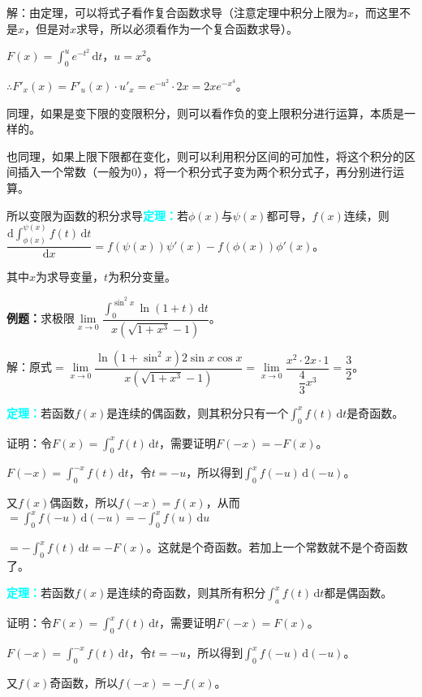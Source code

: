 \documentclass[UTF8, 12pt]{ctexart}
\begin{document}
        解：由定理，可以将式子看作复合函数求导（注意定理中积分上限为$x$，而这里不是$x$，但是对$x$求导，所以必须看作为一个复合函数求导）。

        $F(x)=\int_0^ue^{-t^2}\,\textrm{d}t$，$u=x^2$。

        $\therefore F'_x(x)=F'_u(x)\cdot u'_x=e^{-u^2}\cdot 2x=2xe^{-x^4}$。

        同理，如果是变下限的变限积分，则可以看作负的变上限积分进行运算，本质是一样的。

        也同理，如果上限下限都在变化，则可以利用积分区间的可加性，将这个积分的区间插入一个常数（一般为0），将一个积分式子变为两个积分式子，再分别进行运算。

        所以变限为函数的积分求导\textcolor{aqua}{\textbf{定理：}}若$\phi(x)$与$\psi(x)$都可导，$f(x)$连续，则$\dfrac{\textrm{d}\int_{\phi(x)}^{\psi(x)}f(t)\,\textrm{d}t}{\textrm{d}x}=f(\psi(x))\psi'(x)-f(\phi(x))\phi'(x)$。

        其中$x$为求导变量，$t$为积分变量。

        \textbf{例题：}求极限$\lim\limits_{x\to 0}\dfrac{\int_0^{\sin^2x}\ln(1+t)\,\textrm{d}t}{x(\sqrt{1+x^3}-1)}$。

        解：原式$=\lim\limits_{x\to 0}\dfrac{\ln(1+\sin^2x)2\sin x\cos x}{x(\sqrt{1+x^3}-1)}=\lim\limits_{x\to 0}\dfrac{x^2\cdot 2x\cdot 1}{\dfrac{4}{3}x^3}=\dfrac{3}{2}$。\smallskip

        \textcolor{aqua}{\textbf{定理：}}若函数$f(x)$是连续的偶函数，则其积分只有一个$\int^x_0f(t)\,\textrm{d}t$是奇函数。

        证明：令$F(x)=\int_0^xf(t)\,\textrm{d}t$，需要证明$F(-x)=-F(x)$。

        $F(-x)=\int_0^{-x}f(t)\,\textrm{d}t$，令$t=-u$，所以得到$\int_0^xf(-u)\,\textrm{d}(-u)$。

        又$f(x)$偶函数，所以$f(-x)=f(x)$，从而$=\int_0^xf(-u)\,\textrm{d}(-u)=-\int_0^xf(u)\,\textrm{d}u$

        $=-\int_0^xf(t)\,\textrm{d}t=-F(x)$。这就是个奇函数。若加上一个常数就不是个奇函数了。

        \textcolor{aqua}{\textbf{定理：}}若函数$f(x)$是连续的奇函数，则其所有积分$\int^x_af(t)\,\textrm{d}t$都是偶函数。

        证明：令$F(x)=\int_0^xf(t)\,\textrm{d}t$，需要证明$F(-x)=F(x)$。

        $F(-x)=\int_0^{-x}f(t)\,\textrm{d}t$，令$t=-u$，所以得到$\int_0^xf(-u)\,\textrm{d}(-u)$。

        又$f(x)$奇函数，所以$f(-x)=-f(x)$。
\end{document}
